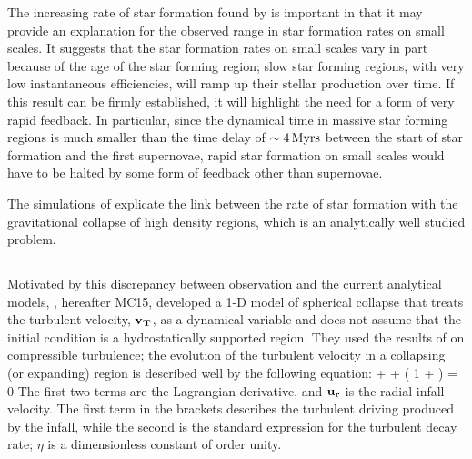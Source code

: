 \documentclass[../dissertation.tex]{subfiles}
\begin{document}
The increasing rate of star formation found by \citet{2015ApJ...800...49L} is important 
in that it may provide an explanation for the observed range in star formation rates on 
small scales.  It suggests that the star formation rates on small scales 
vary in part because of the age of the star forming region; slow star forming 
regions, with very low instantaneous efficiencies, will ramp up their stellar production over time. If this result
can be firmly established, it will highlight the need for a form of very rapid 
feedback. In particular, since the dynamical time in massive star forming regions 
is much smaller than the time delay of $\sim 4{\,\rm Myrs}$ between the start of star 
formation and the first supernovae, rapid star formation on small scales would 
have to be halted by some form of feedback other than supernovae. 

The simulations of  \citet{2015ApJ...800...49L} explicate the link between the rate of star formation with the gravitational collapse of high density regions, which  is  an analytically well studied problem. 

\subsection{\citet{2015ApJ...804...44M}} \label{MC15_model}

Motivated by this discrepancy between observation and the current analytical models,
\citet{2015ApJ...804...44M}, hereafter MC15, developed a 1-D model of
spherical collapse that treats the turbulent velocity, $\mathbf{v_T}$, as a dynamical variable and
does not assume that the initial condition is a hydrostatically supported region. 
They used the results of \citet{2012ApJ...750L..31R} on compressible turbulence; the evolution 
of the turbulent velocity in a collapsing (or expanding) region is described well by the following equation:
%
\be
{} + \ur {} 
+ \left( 1 + \eta \frac{\vt}{\ur} \right)  = 0
\label{eq:hydro_Robertson}
\ee
%
The first two terms are the Lagrangian derivative, and $\mathbf{u_r}$ is the radial infall velocity. The first term in the brackets 
describes the turbulent driving produced by the infall, while the second 
is the standard expression for the turbulent decay rate;  $\eta$ is a dimensionless constant of order unity.
\end{document}
